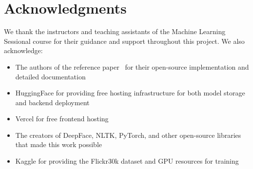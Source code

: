 \documentclass[12pt]{article}
\begin{document}
\section*{Acknowledgments}

We thank the instructors and teaching assistants of the Machine Learning Sessional course for their guidance and support throughout this project. We also acknowledge:

\begin{itemize}
\item The authors of the reference paper~\cite{sankhla2024} for their open-source implementation and detailed documentation
\item HuggingFace for providing free hosting infrastructure for both model storage and backend deployment
\item Vercel for free frontend hosting
\item The creators of DeepFace, NLTK, PyTorch, and other open-source libraries that made this work possible
\item Kaggle for providing the Flickr30k dataset and GPU resources for training
\end{itemize}
\end{document}
